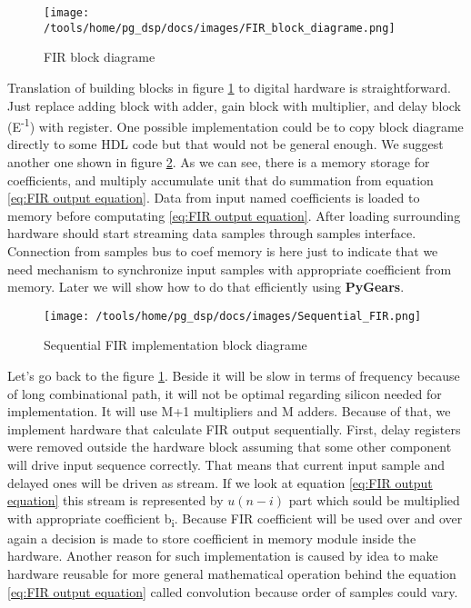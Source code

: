 \documentclass[a4paper, 12pt]{article}
\begin{document}
\begin{figure}[h]
\texttt{[image: /tools/home/pg\_dsp/docs/images/FIR\_block\_diagrame.png]}
\caption{FIR block diagrame}
\label{fig:FIR block diagrame}
\end{figure}

Translation of building blocks in figure \ref{fig:FIR block diagrame} to digital hardware is straightforward. Just replace adding block with adder, gain block with multiplier, and delay block (E\textsuperscript{-1}) with register. One possible implementation could be to copy block diagrame directly to some HDL code but that would not be general enough. We suggest another one shown in figure \ref{fig:Sequential FIR calculation}. As we can see, there is a memory storage for coefficients, and multiply accumulate unit that do summation from equation \ref{eq:FIR output equation}. Data from input named coefficients is loaded to memory before computating \ref{eq:FIR output equation}. After loading surrounding hardware should start streaming data samples through samples interface. Connection from samples bus to coef memory is here just to indicate that we need mechanism to synchronize input samples with appropriate coefficient from memory. Later we will show how to do that efficiently using \textbf{PyGears}.

\begin{figure}[h]
\texttt{[image: /tools/home/pg\_dsp/docs/images/Sequential\_FIR.png]}
\caption{Sequential FIR implementation block diagrame}
\label{fig:Sequential FIR calculation}
\end{figure}


Let's go back to the figure \ref{fig:FIR block diagrame}. Beside it will be slow in terms of frequency because of long combinational path, it will not be optimal regarding silicon needed for implementation. It will use M+1 multipliers and M adders. Because of that, we implement hardware that calculate FIR output sequentially. First, delay registers were removed outside the hardware block assuming that some other component will drive input sequence correctly. That means that current input sample and delayed ones will be driven as stream. If we look at equation \eqref{eq:FIR output equation} this stream is represented by $u(n-i)$ part which sould be multiplied with appropriate coefficient b\textsubscript{i}. Because FIR coefficient will be used over and over again a decision is made to store coefficient in memory module inside the hardware. Another reason for such implementation is caused by idea to make hardware reusable for more general mathematical operation behind the equation \eqref{eq:FIR output equation} called convolution because order of samples could vary.
\end{document}
